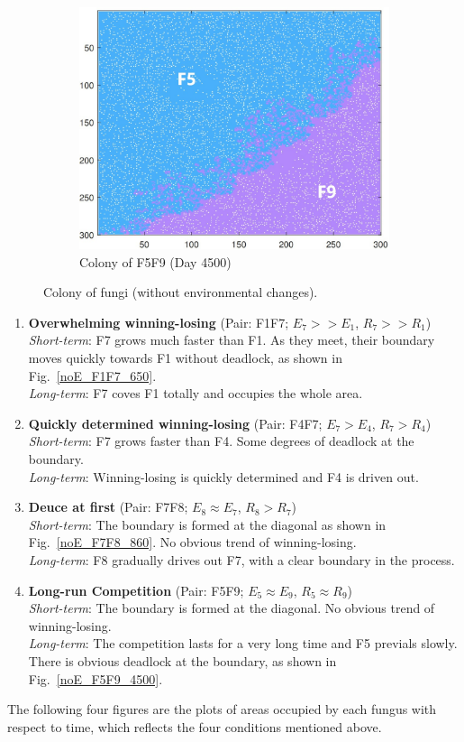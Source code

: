 \documentclass[a4paper,12pt]{article}
\begin{document}
\begin{figure}[H]
\begin{subfigure}{0.3\textwidth}
		\includegraphics[width=\textwidth]{./4/noE_F5F9_4500.jpg}
		\caption{Colony of F5F9 (Day 4500)}
		\label{noE_F5F9_450}
	\end{subfigure}
	\caption{Colony of fungi (without environmental changes).}
	\end{figure}

\begin{enumerate}
\setlength{\itemsep}{0ex} %
\item \textbf{Overwhelming winning-losing} (Pair: F1F7; $E_7>>E_1$, $R_7>>R_1$)
\\\textit{Short-term}: F7 grows much faster than F1. As they meet, their boundary moves quickly towards F1 without deadlock, as shown in Fig.~\ref{noE_F1F7_650}.
\\\textit{Long-term}: F7 coves F1 totally and occupies the whole area.
\item \textbf{Quickly determined winning-losing} (Pair: F4F7; $E_7>E_4$, $R_7>R_4$)
\\\textit{Short-term}: F7 grows faster than F4. Some degrees of deadlock at the boundary.
\\\textit{Long-term}: Winning-losing is quickly determined and F4 is driven out.
\item \textbf{Deuce at first} (Pair: F7F8; $E_8\approx E_7$, $R_8>R_7$)
\\\textit{Short-term}: The boundary is formed at the diagonal as shown in Fig.~\ref{noE_F7F8_860}. No obvious trend of winning-losing.
\\\textit{Long-term}: F8 gradually drives out F7, with a clear boundary in the process.
\item \textbf{Long-run Competition} (Pair: F5F9; $E_5\approx E_9$, $R_5 \approx R_9$)
\\\textit{Short-term}: The boundary is formed at the diagonal. No obvious trend of winning-losing.
\\\textit{Long-term}: The competition lasts for a very long time and F5 previals slowly. There is obvious deadlock at the boundary, as shown in Fig.~\ref{noE_F5F9_4500}.
\end{enumerate}
The following four figures are the plots of areas occupied by each fungus with respect to time, which reflects the four conditions mentioned above. 
\end{document}

